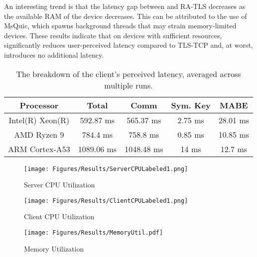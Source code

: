 An interesting trend is that the latency gap between \sysname and RA-TLS decreases as the available RAM of the device decreases. This can be attributed to the use of MsQuic, which spawns background threads that may strain memory-limited devices. These results indicate that on devices with sufficient resources, \sysname significantly reduces user-perceived latency compared to TLS-TCP and, at worst, introduces no additional latency. 

\begin{table}[t]
\small
\centering
\caption{\label{table:times} The breakdown of the client’s perceived latency, averaged across multiple runs.}
\label{results} 
\vspace{-0.1in}
\begin{tabular}{ccccc}
\toprule
\hline
    {\bf Processor}     & {\bf Total} & {\bf Comm}   & {\bf Sym. Key}  & {\bf MABE}     \\ \midrule
    Intel(R) Xeon(R)    & 592.87 ms     & 565.37 ms     & 2.75 ms       & 28.01 ms \\ \hline
    AMD Ryzen 9         & 784.4 ms     & 758.8 ms      & 0.85 ms       & 10.85 ms \\ \hline
    ARM Cortex-A53      & 1089.06 ms     & 1048.48 ms    & 14 ms         & 12.7 ms  \\ 
\hline
\bottomrule
\end{tabular}
\vspace{-0.2in}
\end{table}


\begin{figure*}[h]
\centering
    \begin{minipage}[t]{0.31\textwidth}
        \centering
        \texttt{[image: Figures/Results/ServerCPULabeled1.png]}   
        \vspace{-0.25in}
        \caption{Server CPU Utilization}   
        \label{fig:CPUServer}
    \end{minipage}%
    \hspace{0.01\textwidth}
    \begin{minipage}[t]{0.31\textwidth}
        \centering
        \texttt{[image: Figures/Results/ClientCPULabeled1.png]}  
        \vspace{-0.25in}
        \caption{Client CPU Utilization}   
        \label{fig:CPUClient}
    \end{minipage}%
    \hspace{0.01\textwidth}
    \begin{minipage}[t]{0.31\textwidth}
        \centering
        \texttt{[image: Figures/Results/MemoryUtil.pdf]} 
        \vspace{-0.25in}
        \caption{Memory Utilization}   
        \label{fig:Memory}
    \end{minipage}
    \vspace{-0.1in}
\end{figure*}

